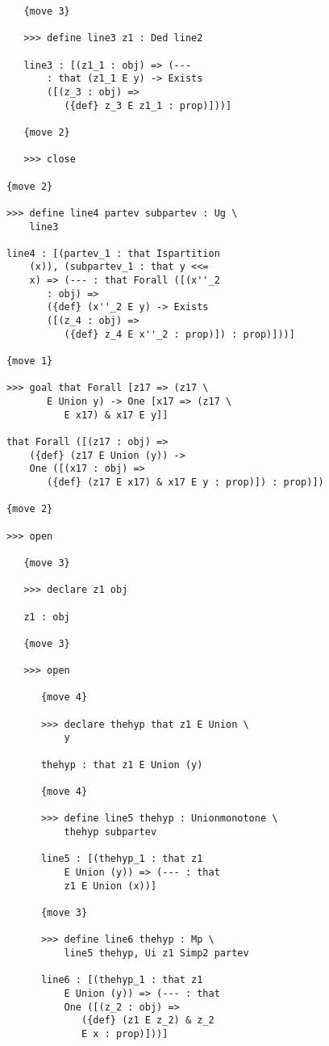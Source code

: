 \documentclass[12pt]{article}
\begin{document}
\begin{verbatim}
         {move 3}

         >>> define line3 z1 : Ded line2

         line3 : [(z1_1 : obj) => (--- 
             : that (z1_1 E y) -> Exists 
             ([(z_3 : obj) => 
                ({def} z_3 E z1_1 : prop)]))]

         {move 2}

         >>> close

      {move 2}

      >>> define line4 partev subpartev : Ug \
          line3

      line4 : [(partev_1 : that Ispartition 
          (x)), (subpartev_1 : that y <<= 
          x) => (--- : that Forall ([(x''_2 
             : obj) => 
             ({def} (x''_2 E y) -> Exists 
             ([(z_4 : obj) => 
                ({def} z_4 E x''_2 : prop)]) : prop)]))]

      {move 1}

      >>> goal that Forall [z17 => (z17 \
             E Union y) -> One [x17 => (z17 \
                E x17) & x17 E y]]

      that Forall ([(z17 : obj) => 
          ({def} (z17 E Union (y)) -> 
          One ([(x17 : obj) => 
             ({def} (z17 E x17) & x17 E y : prop)]) : prop)])

      {move 2}

      >>> open

         {move 3}

         >>> declare z1 obj

         z1 : obj

         {move 3}

         >>> open

            {move 4}

            >>> declare thehyp that z1 E Union \
                y

            thehyp : that z1 E Union (y)

            {move 4}

            >>> define line5 thehyp : Unionmonotone \
                thehyp subpartev

            line5 : [(thehyp_1 : that z1 
                E Union (y)) => (--- : that 
                z1 E Union (x))]

            {move 3}

            >>> define line6 thehyp : Mp \
                line5 thehyp, Ui z1 Simp2 partev

            line6 : [(thehyp_1 : that z1 
                E Union (y)) => (--- : that 
                One ([(z_2 : obj) => 
                   ({def} (z1 E z_2) & z_2 
                   E x : prop)]))]


\end{verbatim}
\end{document}

